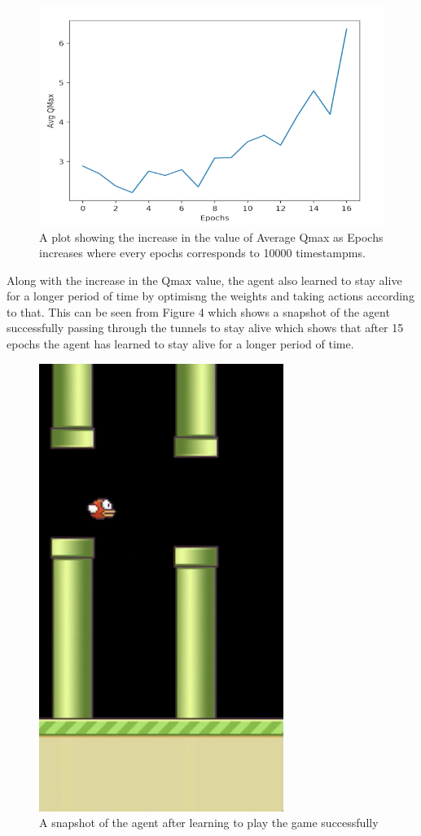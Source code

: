 \documentclass{article}
\begin{document}
\begin{figure}[H]
  \centering
      \includegraphics{res2}
  \caption{A plot showing the increase in the value of Average Qmax as Epochs increases where every epochs corresponds to 10000 timestampms.}
\end{figure}

Along with the increase in the Qmax value, the agent also learned to stay alive for a longer period of time by optimisng the weights and taking actions according to that. This can be seen from Figure 4 which shows a snapshot of the agent successfully passing through the tunnels to stay alive which shows that after 15 epochs the agent has learned to stay alive for a longer period of time. 

\begin{figure}[H]
  \centering
      \includegraphics{res3}
  \caption{A snapshot of the agent after learning to play the game successfully}
\end{figure}
\end{document}
